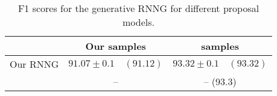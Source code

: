 \begin{table}[h]
\center
\footnotesize
  \begin{tabular}{l|c|c}
        & Our samples & \citet{dyer2016rnng} samples  \\ \hline
      Our RNNG  & $91.07 \pm	0.1 \quad (91.12)$ & $93.32 \pm 0.1 \quad (93.32)$  \\
      \citet{dyer2016rnng}  & -- & -- \quad (93.3)
  \end{tabular}
  \caption{F1 scores for the generative RNNG for different proposal models.}
  \label{tab:gen-fscores}
\end{table}
